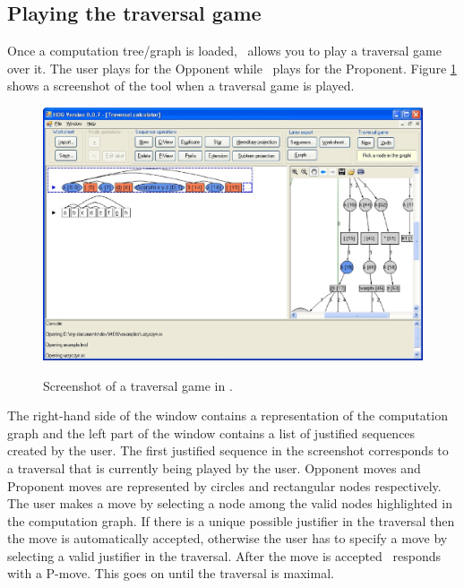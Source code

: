 \subsection{Playing the traversal game}

Once a computation tree/graph is loaded, \toolname\ allows you to play a traversal game over it. The user plays for the Opponent while \toolname\ plays for the Proponent. Figure \ref{fig:sshot_hog_traversal} shows a screenshot of the tool when a traversal game is played.
\begin{figure}
\begin{bigcenter}
  \includegraphics[width=15cm]{sshot_traversal}\\
\end{bigcenter}
  \caption{Screenshot of a traversal game in \toolname.}
  \label{fig:sshot_hog_traversal}
\end{figure}

The right-hand side of the window contains a representation of the computation graph and the left part of the window contains a list of justified sequences created by the user. The first justified sequence in the screenshot corresponds to a traversal that is currently being played by the user. Opponent moves and Proponent moves are represented by circles and rectangular nodes respectively. The user makes a move by selecting a node among the valid nodes highlighted in the computation graph. If there is a unique possible
 justifier in the traversal then the move is automatically
accepted, otherwise the user has to specify a move by selecting a valid justifier in the traversal. After the move is accepted \toolname\ responds with a P-move. This goes on until the traversal is maximal.

